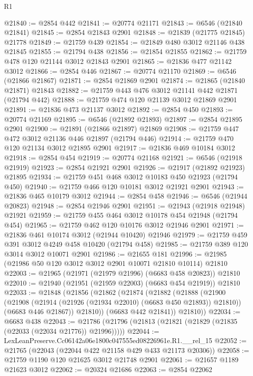\begin{lexlean}{R1}
\begin{coremodule}
@21840 := @2854 @442
@21841 := @20774 @21171
@21843 := @6546 (@21840 @21841)
@21845 := @2854 @21843 @2901
@21848 := @21839 (@21775 @21845) @21778
@21849 := @21759 @439
@21854 := @21849 @480 @3012 @21146 @438 @21845
@21855 := @21794 @438
@21856 := @21854 @21855
@21862 := @21759 @478 @120 @21144 @3012 @21843 @2901
@21865 := @21836 @477 @21142 @3012
@21866 := @2854 @446
@21867 := @20774 @21170
@21869 := @6546 (@21866 @21867)
@21871 := @2854 @21869 @2901
@21874 := @21865 (@21840 @21871) @21843
@21882 := @21759 @443 @476 @3012 @21141 @442 @21871 (@21794 @442)
@21888 := @21759 @474 @120 @21139 @3012 @21869 @2901
@21891 := @21836 @473 @21137 @3012
@21892 := @2854 @450
@21893 := @20774 @21169
@21895 := @6546 (@21892 @21893)
@21897 := @2854 @21895 @2901
@21900 := @21891 (@21866 @21897) @21869
@21908 := @21759 @447 @472 @3012 @21136 @446 @21897 (@21794 @446)
@21914 := @21759 @470 @120 @21134 @3012 @21895 @2901
@21917 := @21836 @469 @10184 @3012
@21918 := @2854 @454
@21919 := @20774 @21168
@21921 := @6546 (@21918 @21919)
@21923 := @2854 @21921 @2901
@21926 := @21917 (@21892 @21923) @21895
@21934 := @21759 @451 @468 @3012 @10183 @450 @21923 (@21794 @450)
@21940 := @21759 @466 @120 @10181 @3012 @21921 @2901
@21943 := @21836 @465 @10179 @3012
@21944 := @2854 @458
@21946 := @6546 (@21944 @20823)
@21948 := @2854 @21946 @2901
@21951 := @21943 (@21918 @21948) @21921
@21959 := @21759 @455 @464 @3012 @10178 @454 @21948 (@21794 @454)
@21965 := @21759 @462 @120 @10176 @3012 @21946 @2901
@21971 := @21836 @461 @10174 @3012 (@21944 @10420) @21946
@21979 := @21759 @459 @391 @3012 @4249 @458 @10420 (@21794 @458)
@21985 := @21759 @389 @120 @3014 @3012 @10071 @2901
@21986 := @21655 @181
@21996 := @21985 (@21986 @50 @120 @3012 @3012 @2901 @10071 @21810 @10114) @21810
@22003 := @21965 (@21971 (@21979 @21996) (@6683 @458 @20823)) @21810
@22010 := @21940 (@21951 (@21959 @22003) (@6683 @454 @21919)) @21810
@22033 := @21848
    (@21856
      (@21862
        (@21874
          (@21882
            (@21888
              (@21900
                (@21908 (@21914 (@21926 (@21934 @22010) (@6683 @450 @21893)) @21810))
                (@6683 @446 @21867))
              @21810))
          (@6683 @442 @21841))
        @21810))
@22034 := @6683 @438
@22043 := @21786 (@21796 (@21813 (@21821 (@21829 (@21835 (@22033 (@22034 @21776)) @21996)))))
@22044 := LexLeanPreserve.Cc06142a06e1800c047555ed08226961e.R1.__rel_15
@22052 := @21765 (@22043 (@22044 @422 @21158 @429 @433 @21173 @20306))
@22058 := @21759 @1190 @120 @21625 @3012 @21748 @2901
@22061 := @21657 @1189 @21623 @3012
@22062 := @20324 @21686
@22063 := @2854 @22062

\end{coremodule}
\end{lexlean}
